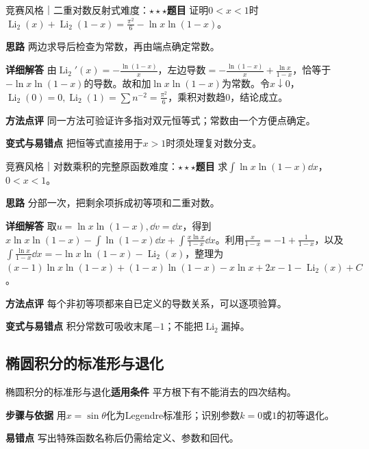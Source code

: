 \begin{example}{竞赛风格｜二重对数反射式}{难度：$\star\star\star$}\label{deep:ex:integral_special_deep:dilog}\textbf{题目} 证明$0<x<1$时$\operatorname{Li}_2(x)+\operatorname{Li}_2(1-x)=\frac{\pi^2}{6}-\ln x\ln(1-x)$。\par\textbf{思路} 两边求导后检查为常数，再由端点确定常数。\par\textbf{详细解答} 由$\operatorname{Li}_2'(x)=-\frac{\ln(1-x)}{x}$，左边导数$=-\frac{\ln(1-x)}{x}+\frac{\ln x}{1-x}$，恰等于$-\ln x\ln(1-x)$的导数。故和加$\ln x\ln(1-x)$为常数。令$x\downarrow0$，$\operatorname{Li}_2(0)=0,\operatorname{Li}_2(1)=\sum n^{-2}=\frac{\pi^2}{6}$，乘积对数趋0，结论成立。\par\textbf{方法点评} 同一方法可验证许多指对双元恒等式；常数由一个方便点确定。\par\textbf{变式与易错点} 把恒等式直接用于$x>1$时须处理复对数分支。\end{example}

\begin{example}{竞赛风格｜对数乘积的完整原函数}{难度：$\star\star\star$}\label{deep:ex:integral_special_deep:logproduct}\textbf{题目} 求$\int\ln x\ln(1-x)\dd x$，$0<x<1$。\par\textbf{思路} 分部一次，把剩余项拆成初等项和二重对数。\par\textbf{详细解答} 取$u=\ln x\ln(1-x),\dd v=\dd x$，得到$x\ln x\ln(1-x)-\int\ln(1-x)\dd x+\int \frac{x\ln x}{1-x}\dd x$。利用$\frac{x}{1-x}=-1+\frac{1}{1-x}$，以及$\int\frac{\ln x}{1-x}\dd x=-\ln x\ln(1-x)-\operatorname{Li}_2(x)$，整理为$(x-1)\ln x\ln(1-x)+(1-x)\ln(1-x)-x\ln x+2x-1-\operatorname{Li}_2(x)+C$。\par\textbf{方法点评} 每个非初等项都来自已定义的导数关系，可以逐项验算。\par\textbf{变式与易错点} 积分常数可吸收末尾$-1$；不能把$\operatorname{Li}_2$漏掉。\end{example}

\subsection{椭圆积分的标准形与退化}\label{deep:integral_special_deep:elliptic}

\begin{method}{椭圆积分的标准形与退化}\textbf{适用条件} 平方根下有不能消去的四次结构。\par\textbf{步骤与依据} 用$x=\sin\theta$化为Legendre标准形；识别参数$k=0$或$1$的初等退化。\par\textbf{易错点} 写出特殊函数名称后仍需给定义、参数和回代。\end{method}

